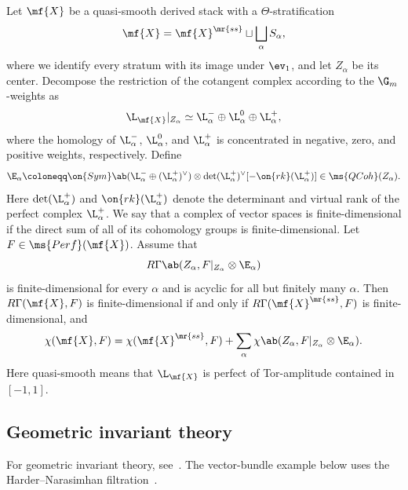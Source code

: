 \begin{thm}
    Let \(\mf{X}\) be a quasi-smooth derived stack with a \(\Theta\)-stratification
    \[
        \mf{X}
        =
        \mf{X}^{\mr{ss}}
        \sqcup
        \bigsqcup_\alpha S_\alpha,
    \]
    where we identify every stratum with its image under \(\ev_1\), and let \(Z_\alpha\) be its center. Decompose the restriction of the cotangent complex according to the \(\G_m\)-weights as
    \[
        \L_{\mf{X}}|_{Z_\alpha}
        \simeq
        \L_\alpha^-
        \oplus
        \L_\alpha^0
        \oplus
        \L_\alpha^+,
    \]
    where the homology of \(\L_\alpha^-\), \(\L_\alpha^0\), and \(\L_\alpha^+\) is concentrated in negative, zero, and positive weights, respectively. Define
    \[
        \E_\alpha
        \coloneqq
        \on{Sym}\ab(
            \L_\alpha^-
            \oplus
            (\L_\alpha^+)^\vee
        )
        \otimes
        \det(\L_\alpha^+)^\vee
        [-\on{rk}(\L_\alpha^+)]
        \in
        \ms{QCoh}(Z_\alpha).
    \]
    Here \(\det(\L_\alpha^+)\) and \(\on{rk}(\L_\alpha^+)\) denote the determinant and virtual rank of the perfect complex \(\L_\alpha^+\). We say that a complex of vector spaces is finite-dimensional if the direct sum of all of its cohomology groups is finite-dimensional.
    Let \(F\in\ms{Perf}(\mf{X})\). Assume that
    \[
        R\Gamma\ab(
            Z_\alpha,
            F|_{Z_\alpha}\otimes\E_\alpha
        )
    \]
    is finite-dimensional for every \(\alpha\) and is acyclic for all but finitely many \(\alpha\). Then \(R\Gamma(\mf{X},F)\) is finite-dimensional if and only if \(R\Gamma(\mf{X}^{\mr{ss}},F)\) is finite-dimensional, and
    \[
        \chi(\mf{X},F)
        =
        \chi(\mf{X}^{\mr{ss}},F)
        +
        \sum_\alpha
        \chi\ab(
            Z_\alpha,
            F|_{Z_\alpha}\otimes\E_\alpha
        ).
    \]
    Here quasi-smooth means that \(\L_{\mf{X}}\) is perfect of Tor-amplitude contained in \([-1,1]\).
\end{thm}


\subsection{Geometric invariant theory}%
\label{sub:Geometric invariant theory}

For geometric invariant theory, see~\cite{MFK1994}. The vector-bundle example below uses the Harder--Narasimhan filtration~\cite{HN1975}.

